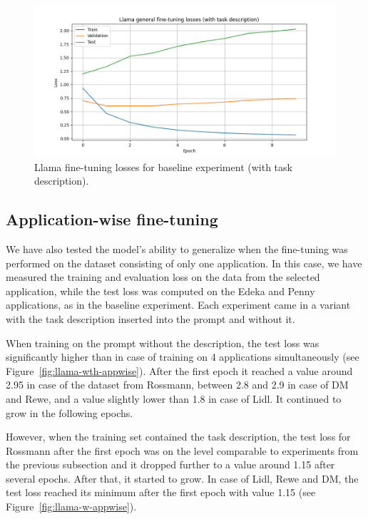 \documentclass[licencjacka,en]{pracamgr}
\begin{document}
\begin{figure}[htbp]
    \centering
    \includegraphics[width=0.8\linewidth]{bachelor_images/llama_ft/llama-w-loss.png}
    \caption{Llama fine-tuning losses for baseline experiment (with task description).}
    \label{fig:llama-w-loss}
\end{figure}

\FloatBarrier

\subsection{Application-wise fine-tuning}

We have also tested the model's ability to generalize when the fine-tuning was performed on the dataset consisting of only one application. In this case, we have measured the training and evaluation loss on the data from the selected application, while the test loss was computed on the Edeka and Penny applications, as in the baseline experiment. Each experiment came in a variant with the task description inserted into the prompt and without it.

When training on the prompt without the description, the test loss was significantly higher than in case of training on 4 applications simultaneously (see Figure~\ref{fig:llama-wth-appwise}). After the first epoch it reached a value around 2.95 in case of the dataset from Rossmann, between 2.8 and 2.9 in case of DM and Rewe, and a value slightly lower than 1.8 in case of Lidl. It continued to grow in the following epochs.

However, when the training set contained the task description, the test loss for Rossmann after the first epoch was on the level comparable to experiments from the previous subsection and it dropped further to a value around 1.15 after several epochs. After that, it started to grow. In case of Lidl, Rewe and DM, the test loss reached its minimum after the first epoch with value 1.15 (see Figure~\ref{fig:llama-w-appwise}).
\end{document}
